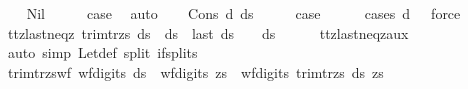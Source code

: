 \begin{isabellebody}
\ \ \isamarkupfalse%
\ Nil\isanewline
\ \ \isamarkupfalse%
\ \isamarkupfalse%
\ {\isacharquery}{\kern0pt}case\ \isamarkupfalse%
\ auto\isanewline
{}\isamarkupfalse%
\isanewline
\ \ \isamarkupfalse%
\ {\isacharparenleft}{\kern0pt}Cons\ d\ ds{\isacharparenright}{\kern0pt}\isanewline
\ \ \isamarkupfalse%
\ \isamarkupfalse%
\ {\isacharquery}{\kern0pt}case\isanewline
\ \ \ \ \isamarkupfalse%
\ {\isacharparenleft}{\kern0pt}cases\ {\isachardoublequoteopen}d\ {\isacharequal}{\kern0pt}\ {}{\isachardoublequoteclose}{\isacharparenright}{\kern0pt}\ force{\isacharplus}{\kern0pt}\isanewline
{}\isamarkupfalse%
%
\endisatagproof
{\isafoldproof}%
%
\isadelimproof
\isanewline
%
\endisadelimproof
\isanewline
{}\isamarkupfalse%
\ ttz{\isacharunderscore}{\kern0pt}last{\isacharunderscore}{\kern0pt}neq{\isacharunderscore}{\kern0pt}z{\isacharcolon}{\kern0pt}\ {\isachardoublequoteopen}trim{\isacharunderscore}{\kern0pt}tr{\isacharunderscore}{\kern0pt}zs\ ds\ {\isacharequal}{\kern0pt}\ ds{\isacharprime}{\kern0pt}\ {\isasymLongrightarrow}\ last\ ds{\isacharprime}{\kern0pt}\ {\isasymnoteq}\ {}\ {\isasymor}\ ds{\isacharprime}{\kern0pt}\ {\isacharequal}{\kern0pt}\ {\isacharbrackleft}{\kern0pt}{\isacharbrackright}{\kern0pt}{\isachardoublequoteclose}\isanewline
%
\isadelimproof
\ \ %
\endisadelimproof
%
\isatagproof
{}\isamarkupfalse%
\ ttz{\isacharunderscore}{\kern0pt}last{\isacharunderscore}{\kern0pt}neq{\isacharunderscore}{\kern0pt}z{\isacharunderscore}{\kern0pt}aux\ \isamarkupfalse%
\ {\isacharparenleft}{\kern0pt}auto\ simp{\isacharcolon}{\kern0pt}\ Let{\isacharunderscore}{\kern0pt}def\ split{\isacharcolon}{\kern0pt}\ if{\isacharunderscore}{\kern0pt}splits{\isacharparenright}{\kern0pt}%
\endisatagproof
{\isafoldproof}%
%
\isadelimproof
\isanewline
%
\endisadelimproof
\isanewline
{}\isamarkupfalse%
\ trim{\isacharunderscore}{\kern0pt}tr{\isacharunderscore}{\kern0pt}zs{\isacharprime}{\kern0pt}{\isacharunderscore}{\kern0pt}wf{\isacharcolon}{\kern0pt}\ {\isachardoublequoteopen}wf{\isacharunderscore}{\kern0pt}digits\ ds\ {\isasymand}\ wf{\isacharunderscore}{\kern0pt}digits\ zs\ {\isasymLongrightarrow}\ wf{\isacharunderscore}{\kern0pt}digits\ {\isacharparenleft}{\kern0pt}trim{\isacharunderscore}{\kern0pt}tr{\isacharunderscore}{\kern0pt}zs{\isacharprime}{\kern0pt}\ ds\ zs{\isacharparenright}{\kern0pt}{\isachardoublequoteclose}\isanewline

\end{isabellebody}
